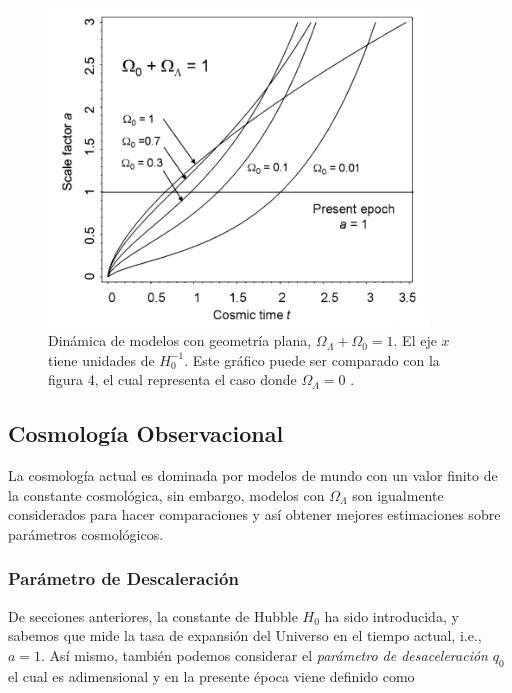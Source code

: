 \documentclass[11pt]{article}
\begin{document}
{    
    \begin{figure}[H]         
     \centering
     \includegraphics[width=0.9\textwidth]{flat_models_pp229_Malcolm.png}
        \caption{\footnotesize{Dinámica de modelos con geometría plana, $\Omega_{\Lambda} + \Omega_0 = 1$. El eje $x$ tiene unidades de  $H_0^{-1}$. Este gráfico puede ser comparado con la figura 4, el cual representa el caso donde $\Omega_{\Lambda}=0$ .}}
     \end{figure}
    
    \subsection{Cosmología Observacional}
    
    La cosmología actual es dominada por modelos de mundo con un valor finito de la constante cosmológica, sin embargo, modelos con $\Omega_{\Lambda}$ son igualmente considerados para hacer comparaciones y así obtener mejores estimaciones sobre parámetros cosmológicos.
    
    \subsubsection{Parámetro de Descaleración}
    
    De secciones anteriores, la constante de Hubble $H_0$ ha sido introducida, y sabemos que mide la tasa de expansión del Universo en el tiempo actual, i.e., $a=1$. Así mismo, también podemos considerar el {\textit{parámetro de desaceleración}} $q_0$ el cual es adimensional y en la presente época viene definido como
    
}
\end{document}
